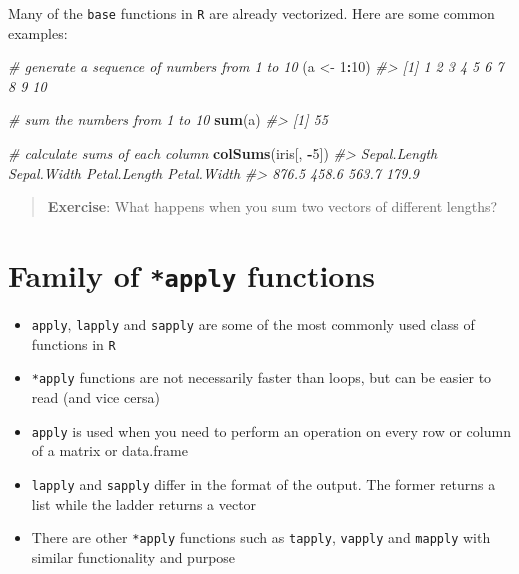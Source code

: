 \documentclass[]{book}
\makeatletter
\newenvironment{Shaded}{\begin{snugshade}}{\end{snugshade}}
\newcommand{\KeywordTok}[1]{\textcolor[rgb]{0.13,0.29,0.53}{\textbf{#1}}}
\newcommand{\DecValTok}[1]{\textcolor[rgb]{0.00,0.00,0.81}{#1}}
\newcommand{\StringTok}[1]{\textcolor[rgb]{0.31,0.60,0.02}{#1}}
\newcommand{\CommentTok}[1]{\textcolor[rgb]{0.56,0.35,0.01}{\textit{#1}}}
\newcommand{\OperatorTok}[1]{\textcolor[rgb]{0.81,0.36,0.00}{\textbf{#1}}}
\newcommand{\NormalTok}[1]{#1}
\providecommand{\tightlist}{%
  \setlength{\itemsep}{0pt}\setlength{\parskip}{0pt}}
\providecommand{\tightlist}{%
  \setlength{\itemsep}{0pt}\setlength{\parskip}{0pt}}
\newenvironment{kframe}{%
\medskip{}
\setlength{\fboxsep}{.8em}
 \def\at@end@of@kframe{}%
 \ifinner\ifhmode%
  \def\at@end@of@kframe{\end{minipage}}%
  \begin{minipage}{\columnwidth}%
 \fi\fi%
 \def\FrameCommand##1{\hskip\@totalleftmargin \hskip-\fboxsep
 \colorbox{shadecolor}{##1}\hskip-\fboxsep
     \hskip-\linewidth \hskip-\@totalleftmargin \hskip\columnwidth}%
 \MakeFramed {\advance\hsize-\width
   \@totalleftmargin\z@ \linewidth\hsize
   \@setminipage}}%
 {\par\unskip\endMakeFramed%
 \at@end@of@kframe}
\renewenvironment{Shaded}{\begin{kframe}}{\end{kframe}}
\theoremstyle{definition}
\theoremstyle{definition}
\theoremstyle{definition}
\theoremstyle{remark}
\makeatother
\begin{document}
Many of the \texttt{base} functions in \texttt{R} are already
vectorized. Here are some common examples:

\begin{Shaded}
\begin{Highlighting}[]

\CommentTok{# generate a sequence of numbers from 1 to 10}
\NormalTok{(a <-}\StringTok{ }\DecValTok{1}\OperatorTok{:}\DecValTok{10}\NormalTok{)}
\CommentTok{#>  [1]  1  2  3  4  5  6  7  8  9 10}

\CommentTok{# sum the numbers from 1 to 10}
\KeywordTok{sum}\NormalTok{(a)}
\CommentTok{#> [1] 55}

\CommentTok{# calculate sums of each column}
\KeywordTok{colSums}\NormalTok{(iris[, }\OperatorTok{-}\DecValTok{5}\NormalTok{])}
\CommentTok{#> Sepal.Length  Sepal.Width Petal.Length  Petal.Width }
\CommentTok{#>        876.5        458.6        563.7        179.9}
\end{Highlighting}
\end{Shaded}

\begin{quote}
\textbf{Exercise}: What happens when you sum two vectors of different
lengths?
\end{quote}

\section{\texorpdfstring{Family of \texttt{*apply}
functions}{Family of *apply functions}}\label{family-of-apply-functions}

\begin{itemize}
\tightlist
\item
  \texttt{apply}, \texttt{lapply} and \texttt{sapply} are some of the
  most commonly used class of functions in \texttt{R}
\item
  \texttt{*apply} functions are not necessarily faster than loops, but
  can be easier to read (and vice cersa)
\item
  \texttt{apply} is used when you need to perform an operation on every
  row or column of a matrix or data.frame
\item
  \texttt{lapply} and \texttt{sapply} differ in the format of the
  output. The former returns a list while the ladder returns a vector
\item
  There are other \texttt{*apply} functions such as \texttt{tapply},
  \texttt{vapply} and \texttt{mapply} with similar functionality and
  purpose
\end{itemize}
\end{document}
